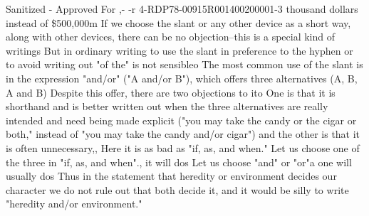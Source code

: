 \documentclass[
    oneside,
    11pt,
    draft
]{memoir}
\begin{document}
Sanitized - Approved For ,- -r 4-RDP78-00915R001400200001-3 thousand dollars instead of \$500,000m If we choose the slant or any other device as a short way, along with other devices, there can be no objection--this is a special kind of writings But in ordinary writing to use the slant in preference to the hyphen or to avoid writing out "of the" is not sensibleo The most common use of the slant is in the expression "and/or" ("A and/or B"), which offers three alternatives (A, B, A and B) Despite this offer, there are two objections to ito One is that it is shorthand and is better written out when the three alternatives are really intended and need being made explicit ("you may take the candy or the cigar or both," instead of "you may take the candy and/or cigar") and the other is that it is often unnecessary,, Here it is as bad as "if, as, and when." Let us choose one of the three in "if, as, and when"., it will dos Let us choose "and" or "or"a one will usually dos Thus in the statement that heredity or environment decides our character we do not rule out that both decide it, and it would be silly to write "heredity and/or environment."
\end{document}

